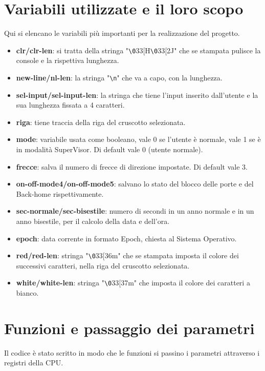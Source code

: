 \documentclass{article}
\newcommand*{\escape}[1]{\texttt{\textbackslash#1}}
\begin{document}
\section{Variabili utilizzate e il loro scopo}
Qui si elencano le variabili più importanti per la realizzazione del progetto.
\begin{itemize}
    \item \textbf{clr/clr-len}: si tratta della stringa "\escape{0}33[H\escape{0}33[2J" che se stampata pulisce la console e la rispettiva lunghezza.
    \item \textbf{new-line/nl-len}: la stringa "\escape{n}" che va a capo, con la lunghezza.
    \item \textbf{sel-input/sel-input-len}: la stringa che tiene l'input inserito dall'utente e la sua lunghezza fissata a 4 caratteri.
    \item \textbf{riga}: tiene traccia della riga del cruscotto selezionata.
    \item \textbf{mode}: variabile usata come booleano, vale 0 se l'utente è normale, vale 1 se è in modalità SuperVisor. Di default vale 0 (utente normale).
    \item \textbf{frecce}: salva il numero di frecce di direzione impostate. Di default vale 3.
    \item \textbf{on-off-mode4/on-off-mode5}: salvano lo stato del blocco delle porte e del Back-home rispettivamente.
    \item \textbf{sec-normale/sec-bisestile}: numero di secondi in un anno normale e in un anno bisestile, per il calcolo della data e dell'ora.
    \item \textbf{epoch}: data corrente in formato Epoch, chiesta al Sistema Operativo.
    \item \textbf{red/red-len}: stringa "\escape{0}33[36m" che se stampata imposta il colore dei successivi caratteri, nella riga del cruscotto selezionata.
    \item \textbf{white/white-len}: stringa "\escape{0}33[37m" che imposta il colore dei caratteri a bianco.
    
\end{itemize}

\section{Funzioni e passaggio dei parametri}
Il codice è stato scritto in modo che le funzioni si passino i parametri attraverso i registri della CPU.
\end{document}
